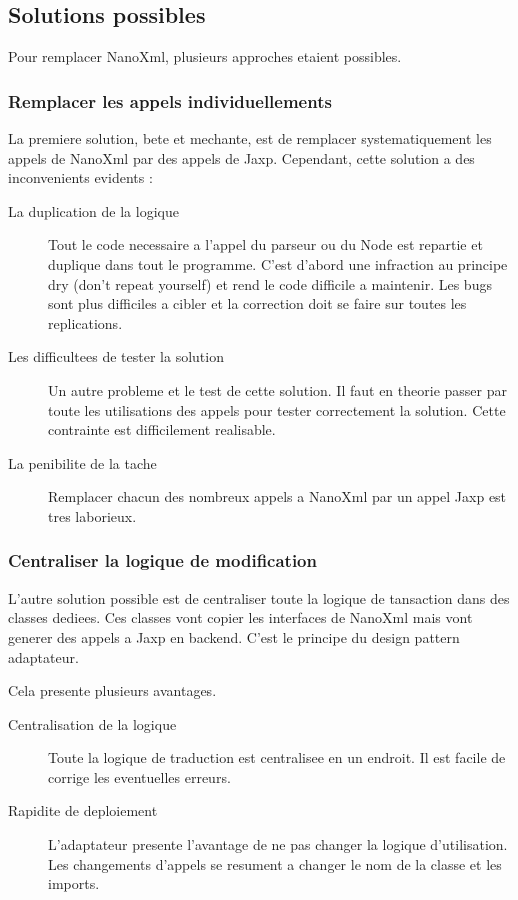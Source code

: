 \subsection{Solutions possibles}
Pour remplacer NanoXml, plusieurs approches etaient possibles. 
\subsubsection{Remplacer les appels individuellements}
La premiere solution, bete et mechante, est de remplacer systematiquement les appels de NanoXml par des appels de Jaxp. Cependant, cette solution a des inconvenients evidents :
\begin{description}
\item[La duplication de la logique] Tout le code necessaire a l'appel du parseur ou du Node est repartie et duplique dans tout le programme. C'est d'abord une infraction au principe dry (don't repeat yourself) et rend le code difficile a maintenir. Les bugs sont plus difficiles a cibler et la correction doit se faire sur toutes les replications.
\item[Les difficultees de tester la solution] Un autre probleme et le test de cette solution. Il faut en theorie passer par toute les utilisations des appels pour tester correctement la solution. Cette contrainte est difficilement realisable.
\item[La penibilite de la tache] Remplacer chacun des nombreux appels a NanoXml par un appel Jaxp est tres laborieux. 
\end{description}
\subsubsection{Centraliser la logique de modification}
L'autre solution possible est de centraliser toute la logique de tansaction dans des classes dediees. Ces classes vont copier les interfaces de NanoXml mais vont generer des appels a Jaxp en backend. C'est le principe du design pattern adaptateur.

Cela presente plusieurs avantages.
\begin{description}
\item[Centralisation de la logique] Toute la logique de traduction est centralisee en un endroit. Il est facile de corrige les eventuelles erreurs.
\item[Rapidite de deploiement] L'adaptateur presente l'avantage de ne pas changer la logique d'utilisation. Les changements d'appels se resument a changer le nom de la classe et les imports.
\end{description}
